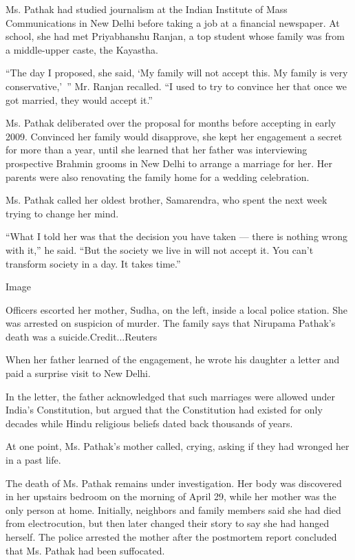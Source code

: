 Ms. Pathak had studied journalism at the Indian Institute of Mass
Communications in New Delhi before taking a job at a financial
newspaper. At school, she had met Priyabhanshu Ranjan, a top student
whose family was from a middle-upper caste, the Kayastha.

``The day I proposed, she said, `My family will not accept this. My
family is very conservative,'~'' Mr. Ranjan recalled. ``I used to try to
convince her that once we got married, they would accept it.''

Ms. Pathak deliberated over the proposal for months before accepting in
early 2009. Convinced her family would disapprove, she kept her
engagement a secret for more than a year, until she learned that her
father was interviewing prospective Brahmin grooms in New Delhi to
arrange a marriage for her. Her parents were also renovating the family
home for a wedding celebration.

Ms. Pathak called her oldest brother, Samarendra, who spent the next
week trying to change her mind.

``What I told her was that the decision you have taken --- there is
nothing wrong with it,'' he said. ``But the society we live in will not
accept it. You can't transform society in a day. It takes time.''

Image

Officers escorted her mother, Sudha, on the left, inside a local police
station. She was arrested on suspicion of murder. The family says that
Nirupama Pathak's death was a suicide.Credit...Reuters

When her father learned of the engagement, he wrote his daughter a
letter and paid a surprise visit to New Delhi.

In the letter, the father acknowledged that such marriages were allowed
under India's Constitution, but argued that the Constitution had existed
for only decades while Hindu religious beliefs dated back thousands of
years.

At one point, Ms. Pathak's mother called, crying, asking if they had
wronged her in a past life.

The death of Ms. Pathak remains under investigation. Her body was
discovered in her upstairs bedroom on the morning of April 29, while her
mother was the only person at home. Initially, neighbors and family
members said she had died from electrocution, but then later changed
their story to say she had hanged herself. The police arrested the
mother after the postmortem report concluded that Ms. Pathak had been
suffocated.

